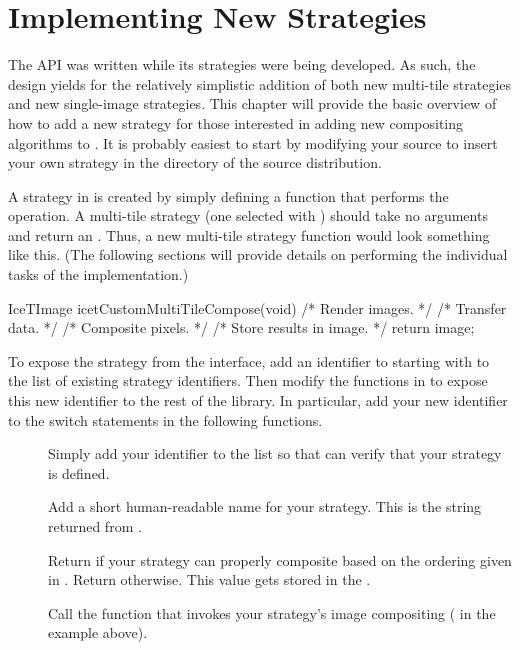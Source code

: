 

\chapter{Implementing New Strategies}
\label{sec:New_Strategies}

The \IceT API was written while its strategies were being developed.  As
such, the design yields for the relatively simplistic addition of both new
multi-tile strategies and new single-image strategies.  This chapter will
provide the basic overview of how to add a new strategy for those
interested in adding new compositing algorithms to \IceT.  It is probably
easiest to start by modifying your \IceT source to insert your own strategy
in the  directory of the \IceT source distribution.

A strategy in \IceT is created by simply defining a function that performs
the operation.  A multi-tile strategy (one selected with
) should take no arguments and return an
.  Thus, a new multi-tile strategy function would look
something like this.  (The following sections will provide details on
performing the individual tasks of the implementation.)

\begin{code}
IceTImage icetCustomMultiTileCompose(void)
{
    /* Render images. */
    /* Transfer data. */
    /* Composite pixels. */
    /* Store results in image. */
    return image;
}
\end{code}

To expose the strategy from the \IceT interface, add an identifier to
 starting with  to the list of
existing strategy identifiers.  Then modify the functions in
 to expose this new identifier to the rest
of the \IceT library.  In particular, add your new identifier to the switch
statements in the following functions.

\begin{description}
\item[] Simply add your identifier to the
  list so that \IceT can verify that your strategy is defined.
\item[] Add a short human-readable
  name for your strategy.  This is the string returned from
  .
\item[] Return 
  if your strategy can properly composite based on the ordering given in
  .  Return  otherwise.
  This value gets stored in the .
\item[] Call the function that invokes
  your strategy's image compositing ( in
  the example above).
\end{description}

